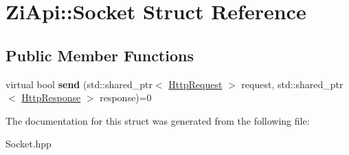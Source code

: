 \hypertarget{structZiApi_1_1Socket}{}\section{Zi\+Api\+::Socket Struct Reference}
\label{structZiApi_1_1Socket}
\subsection*{Public Member Functions}
\begin{DoxyCompactItemize}
\item 
\mbox{\label{structZiApi_1_1Socket_a5d214873c8d8b25581e9af28fc78c46b}} 
virtual bool {\bfseries send} (std\+::shared\+\_\+ptr$<$ \mbox{\hyperlink{classZiApi_1_1HttpRequest}{Http\+Request}} $>$ request, std\+::shared\+\_\+ptr$<$ \mbox{\hyperlink{classZiApi_1_1HttpResponse}{Http\+Response}} $>$ response)=0
\end{DoxyCompactItemize}


The documentation for this struct was generated from the following file\+:\begin{DoxyCompactItemize}
\item 
Socket.\+hpp\end{DoxyCompactItemize}

